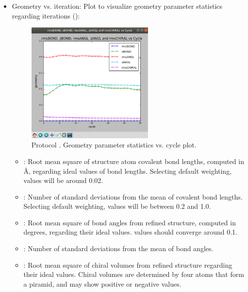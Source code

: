 \begin{itemize}
\begin{itemize}
\begin{figure}[H]
         \label{fig:app_protocol_refmac_11}
        \end{figure}
     \item Geometry vs. iteration:
     Plot to visualize geometry parameter statistics regarding iterations ():
     \begin{figure}[H]
         \centering 
         \captionsetup{width=.7\linewidth} 
         \includegraphics[width=0.60\textwidth]{Images_appendix/Fig137.pdf}
         \caption{Protocol . Geometry parameter statistics vs. cycle plot.}
         \label{fig:app_protocol_refmac_12}
        \end{figure}
     \begin{itemize}
     \item {}: Root mean square of structure atom covalent bond lengths, computed in \AA, regarding ideal values of bond lengths. Selecting default weighting,  values will be around 0.02.
     
     \item {}: Number of standard deviations from the mean of covalent bond lengths. Selecting default weighting,  values will be between 0.2 and 1.0.
     
     \item {}: Root mean square of bond angles from refined structure, computed in degrees, regarding their ideal values.  values should converge around 0.1.
     
     \item {}: Number of standard deviations from the mean of bond angles. 
     
     \item {}: Root mean square of chiral volumes from refined structure regarding their ideal values. Chiral volumes are determined by four atoms that form a piramid, and may show positive or negative values. 
     \end{itemize}
    \end{itemize}


\end{itemize}
